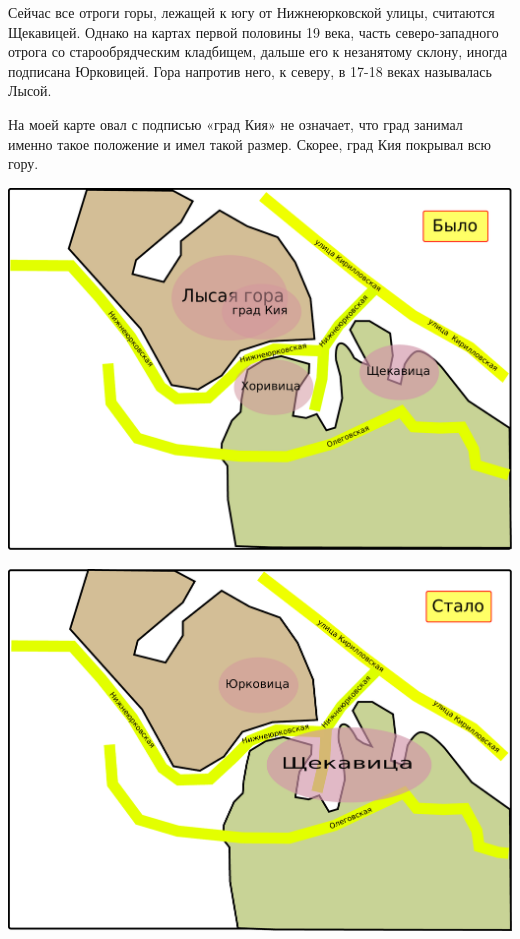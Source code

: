Сейчас все отроги горы, лежащей к югу от Нижнеюрковской улицы, считаются Щекавицей. Однако на картах первой половины 19 века, часть северо-западного отрога со старообрядческим кладбищем, дальше его к незанятому склону, иногда подписана Юрковицей. Гора напротив него, к северу, в 17-18 веках называлась Лысой. 

На моей карте овал с подписью «град Кия» не означает, что град занимал именно такое положение и имел такой размер. Скорее, град Кия покрывал всю гору.

\begin{center}
\includegraphics[width=0.90\linewidth]{chast-kirvys/poisk-yourk/yourk-bylo.pdf}
\end{center} 

\begin{center}
\includegraphics[width=0.90\linewidth]{chast-kirvys/poisk-yourk/yourk-stalo.pdf}
\end{center} 

